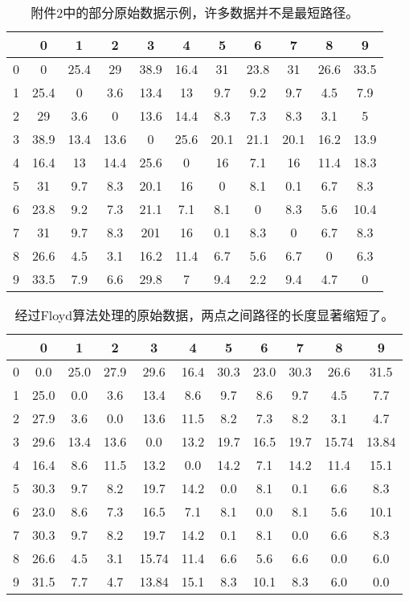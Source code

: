 \documentclass[UTF8,cs4size]{ctexart}
\begin{document}
\begin{table}[!p]
\centering
\begin{tabular}{r|cccccccccc}
&0 & 1 & 2 & 3 & 4 & 5 & 6 & 7 & 8 & 9 \\
\hline
0 & 0	&	25.4	&	29	&	38.9	&	16.4	&	31	&	23.8	&	31	&	26.6	&	33.5	 \\
1 & 25.4	&	0	&	3.6	&	13.4	&	13	&	9.7	&	9.2	&	9.7	&	4.5	&	7.9	 \\
2 & 29	&	3.6	&	0	&	13.6	&	14.4	&	8.3	&	7.3	&	8.3	&	3.1	&	5	 \\
3 & 38.9	&	13.4	&	13.6	&	0	&	25.6	&	20.1	&	21.1	&	20.1	&	16.2	&	13.9	 \\
4 & 16.4	&	13	&	14.4	&	25.6	&	0	&	16	&	7.1	&	16	&	11.4	&	18.3	 \\
5 & 31	&	9.7	&	8.3	&	20.1	&	16	&	0	&	8.1	&	0.1	&	6.7	&	8.3	 \\
6 & 23.8	&	9.2	&	7.3	&	21.1	&	7.1	&	8.1	&	0	&	8.3	&	5.6	&	10.4	 \\
7 & 31	&	9.7	&	8.3	&	201	&	16	&	0.1	&	8.3	&	0	&	6.7	&	8.3	 \\
8 & 26.6	&	4.5	&	3.1	&	16.2	&	11.4	&	6.7	&	5.6	&	6.7	&	0	&	6.3	 \\
9 & 33.5	&	7.9	&	6.6	&	29.8	&	7	&	9.4	&	2.2	&	9.4	&	4.7	&	0	 \\
\end{tabular}
\caption{附件2中的部分原始数据示例，许多数据并不是最短路径。}\label{table:longest}
\end{table}

\begin{table}[!p]
\centering
\begin{tabular}{r|cccccccccc}
&0 & 1 & 2 & 3 & 4 & 5 & 6 & 7 & 8 & 9 \\
\hline
0 & 0.0	&	25.0	&	27.9	&	29.6	&	16.4	&	30.3	&	23.0	&	30.3	&	26.6	&	31.5	 \\
1 & 25.0	&	0.0	&	3.6	&	13.4	&	8.6	&	9.7	&	8.6	&	9.7	&	4.5	&	7.7	 \\
2 & 27.9	&	3.6	&	0.0	&	13.6	&	11.5	&	8.2	&	7.3	&	8.2	&	3.1	&	4.7	 \\
3 & 29.6	&	13.4	&	13.6	&	0.0	&	13.2	&	19.7	&	16.5	&	19.7	&	15.74	&	13.84	 \\
4 & 16.4	&	8.6	&	11.5	&	13.2	&	0.0	&	14.2	&	7.1	&	14.2	&	11.4	&	15.1	 \\
5 & 30.3	&	9.7	&	8.2	&	19.7	&	14.2	&	0.0	&	8.1	&	0.1	&	6.6	&	8.3	 \\
6 & 23.0	&	8.6	&	7.3	&	16.5	&	7.1	&	8.1	&	0.0	&	8.1	&	5.6	&	10.1	 \\
7 & 30.3	&	9.7	&	8.2	&	19.7	&	14.2	&	0.1	&	8.1	&	0.0	&	6.6	&	8.3	 \\
8 & 26.6	&	4.5	&	3.1	&	15.74	&	11.4	&	6.6	&	5.6	&	6.6	&	0.0	&	6.0	 \\
9 & 31.5	&	7.7	&	4.7	&	13.84	&	15.1	&	8.3	&	10.1	&	8.3	&	6.0	&	0.0	 \\
\end{tabular}
\caption{经过Floyd算法处理的原始数据，两点之间路径的长度显著缩短了。} \label{table:shortest}
\end{table}
\end{document}
